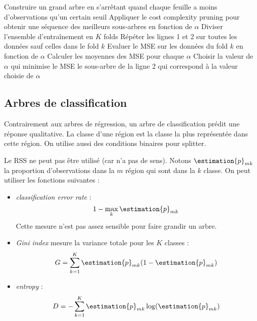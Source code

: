             \begin{algorithm}
                \begin{algorithmic}[1]
                    \State Construire un grand arbre en s'arrêtant quand chaque feuille a moins d'observations qu'un certain seuil
                    \State Appliquer le cost complexity pruning pour obtenir une séquence des meilleurs sous-arbres en fonction de \(\alpha\)
                    \State Diviser l'ensemble d'entraînement en \(K\) folds
                        \State Répéter les lignes 1 et 2 sur toutes les données sauf celles dans le fold \(k\)
                        \State Evaluer le MSE sur les données du fold \(k\) en fonction de \(\alpha\)
                    \EndFor
                    \State Calculer les moyennes des MSE pour chaque \(\alpha\)
                    \State Choisir la valeur de \(\alpha\) qui minimise le MSE
                    \State \Return le sous-arbre de la ligne 2 qui correspond à la valeur choisie de \(\alpha\)
                \end{algorithmic}
            \end{algorithm}

    \subsection{Arbres de classification}
        Contrairement aux arbres de régression, un arbre de classification prédit une réponse qualitative. La classe d'une région est la classe la plus représentée dans cette région. On utilise aussi des conditions binaires pour splitter.

        Le RSS ne peut pas être utilisé (car n'a pas de sens). Notons \(\estimation{p}_{mk}\) la proportion d'observations dans la \(m\)\ieme{} région qui sont dans la \(k\)\ieme{} classe. On peut utiliser les fonctions suivantes :
        \begin{itemize}
            \item \textit{classification error rate} :
            \[
                1 - \max_k \estimation{p}_{mk}
            \]
            Cette mesure n'est pas assez sensible pour faire grandir un arbre.
            \item \textit{Gini index} mesure la variance totale pour les \(K\) classes :
            \[
                G = \sum_{k=1}^K \estimation{p}_{mk} (1 - \estimation{p}_{mk})
            \]
            \item \textit{entropy} :
            \[
                D = -\sum_{k=1}^K \estimation{p}_{mk} \log(\estimation{p}_{mk})
            \]
        \end{itemize}


